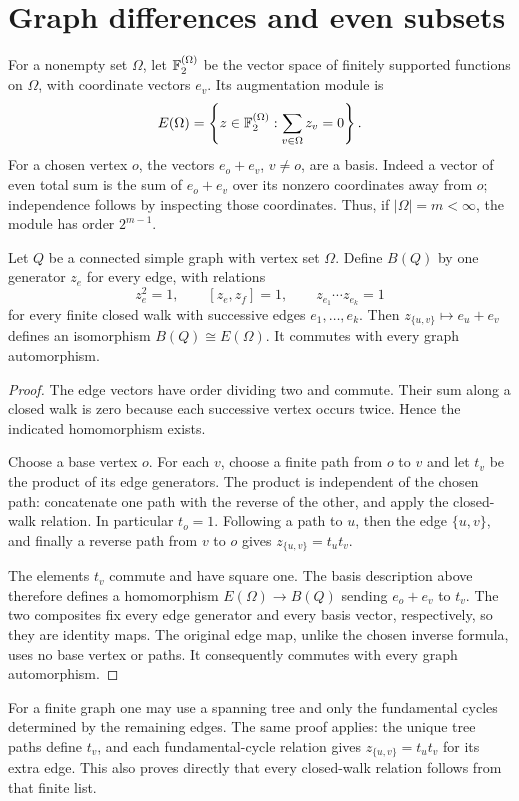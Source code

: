 \section{Graph differences and even subsets}
For a nonempty set $\Omega$, let $\mathbb F_2^{(\Omega)}$ be the vector space
of finitely supported functions on $\Omega$, with coordinate vectors
$e_v$. Its augmentation module is
\[
 E(\Omega)=\left\{z\in\mathbb F_2^{(\Omega)}:
                 \sum_{v\in\Omega}z_v=0\right\}.
\]
For a chosen vertex $o$, the vectors $e_o+e_v$, $v\ne o$, are a basis.
Indeed a vector of even total sum is the sum of $e_o+e_v$ over its
nonzero coordinates away from $o$; independence follows by inspecting
those coordinates. Thus, if $|\Omega|=m<\infty$, the module has order
$2^{m-1}$.

\begin{theorem}\label{UC.graphmodule}
Let $Q$ be a connected simple graph with vertex set $\Omega$. Define
$B(Q)$ by one generator $z_e$ for every edge, with relations
\[
 z_e^2=1,\qquad [z_e,z_f]=1,
 \qquad z_{e_1}\cdots z_{e_k}=1
\]
for every finite closed walk with successive edges $e_1,\ldots,e_k$.
Then $z_{\{u,v\}}\mapsto e_u+e_v$ defines an isomorphism
$B(Q)\cong E(\Omega)$. It commutes with every graph automorphism.
\end{theorem}
\begin{proof}
The edge vectors have order dividing two and commute. Their sum along a
closed walk is zero because each successive vertex occurs twice. Hence
the indicated homomorphism exists.

Choose a base vertex $o$. For each $v$, choose a finite path from $o$ to
$v$ and let $t_v$ be the product of its edge generators. The product is
independent of the chosen path: concatenate one path with the reverse
of the other, and apply the closed-walk relation. In particular $t_o=1$.
Following a path to $u$, then the edge $\{u,v\}$, and finally a reverse
path from $v$ to $o$ gives $z_{\{u,v\}}=t_ut_v$.

The elements $t_v$ commute and have square one. The basis description
above therefore defines a homomorphism $E(\Omega)\to B(Q)$ sending
$e_o+e_v$ to $t_v$. The two composites fix every edge generator and
every basis vector, respectively, so they are identity maps.
The original edge map, unlike the chosen inverse formula, uses no
base vertex or paths. It consequently commutes with every graph
automorphism.
\end{proof}

For a finite graph one may use a spanning tree and only the fundamental
cycles determined by the remaining edges. The same proof applies:
the unique tree paths define $t_v$, and each fundamental-cycle relation
gives $z_{\{u,v\}}=t_ut_v$ for its extra edge. This also proves directly
that every closed-walk relation follows from that finite list.

